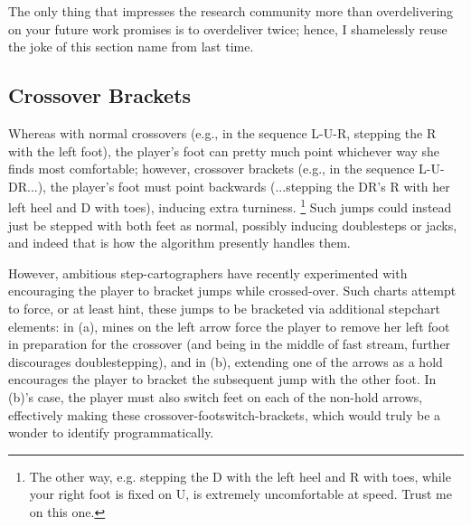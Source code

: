 \documentclass[10pt]{sigplanconf}
\begin{document}
The only thing that impresses the research community more than overdelivering on your future work promises
is to overdeliver twice; hence, I shamelessly reuse the joke of this section name from last time.

\subsection{Crossover Brackets}
\label{sec:xover-brackers}

Whereas with normal crossovers (e.g., in the sequence L-U-R, stepping the R with the left foot),
the player's foot can pretty much point whichever way she finds most comfortable;
however,
crossover brackets (e.g., in the sequence L-U-DR...),
the player's foot must point backwards (...stepping the DR's R with her left heel and D with toes),
inducing extra turniness.%
\footnote{The other way, e.g. stepping the D with the left heel and R with toes, while your right foot is fixed on U, is extremely uncomfortable at speed. Trust me on this one.}
Such jumps could instead just be stepped with both feet as normal,
possibly inducing doublesteps or jacks,
and indeed that is how the algorithm presently handles them.

However, ambitious step-cartographers have recently experimented with encouraging the player to bracket jumps while crossed-over.
Such charts attempt to force, or at least hint, these jumps to be bracketed
via additional stepchart elements: in (a), mines on the left arrow force the player to remove her left foot in preparation for the crossover (and being in the middle of fast stream, further discourages doublestepping),
and in (b), extending one of the arrows as a hold encourages the player to bracket the subsequent jump with the other foot.
In (b)'s case, the player must also switch feet on each of the non-hold arrows,
effectively making these crossover-footswitch-brackets,
which would truly be a wonder to identify programmatically.
\end{document}
